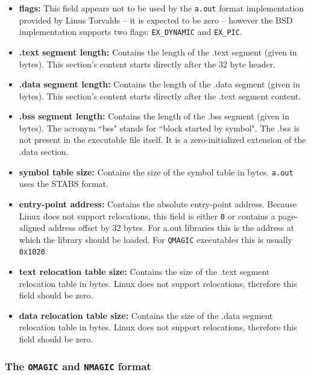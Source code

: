\documentclass{article}
\begin{document}
\begin{itemize}
\item \textbf{flags:} This field appears not to be used by the \texttt{a.out} format implementation provided by Linus Torvalds -- it is expected to be zero \cite[line 285]{BinfmtAoutC} --
however the BSD implementation supports two flags: \texttt{EX\_DYNAMIC} and \texttt{EX\_PIC}\cite{FreeBSDAoutManPage}.

\item \textbf{.text segment length:} Contains the length of the .text segment (given in bytes). This section's content starts directly after the 32 byte header.

\item \textbf{.data segment length:} Contains the length of the .data segment (given in bytes). This section's content starts directly after the .text segment content.

\item \textbf{.bss segment length:} Contains the length of the .bss segment (given in bytes). The acronym ``bss" stands for ``block started by symbol". The .bss is not present in the executable file itself. It is a zero-initialized extension of the .data section.

\item \textbf{symbol table size:} Contains the size of the symbol table in bytes. \texttt{a.out} uses the STABS format.

\item \textbf{entry-point address:} Contains the absolute entry-point address. Because Linux does not support relocations, this field is either \texttt{0} or contains a page-aligned address offset by 32 bytes. For a.out libraries this is the address at which the library should be loaded. For \texttt{QMAGIC} executables this is usually \texttt{0x1020}.

\item \textbf{text relocation table size:} Contains the size of the .text segment relocation table in bytes. Linux does not support relocations, therefore this field should be zero.

\item \textbf{data relocation table size:} Contains the size of the .data segment relocation table in bytes. Linux does not support relocations, therefore this field should be zero.
\end{itemize}

\subsubsection{The \texttt{OMAGIC} and \texttt{NMAGIC} format}
\label{formatdesc_onmagic}
\end{document}
